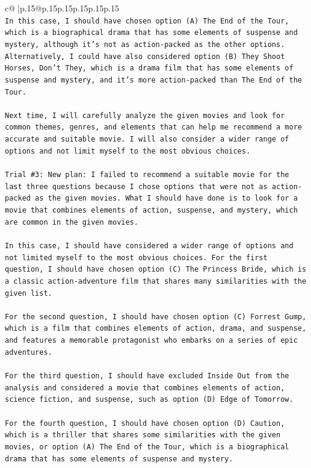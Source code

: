\documentclass{article}
\begin{document}
{\begin{supertabular}{c@{$\;$}|p{.15\linewidth}@{}p{.15\linewidth}p{.15\linewidth}p{.15\linewidth}p{.15\linewidth}p{.15\linewidth}}
{{{\\ 
\texttt{In this case, I should have chosen option (A) The End of the Tour, which is a biographical drama that has some elements of suspense and mystery, although it's not as action{-}packed as the other options. Alternatively, I could have also considered option (B) They Shoot Horses, Don't They, which is a drama film that has some elements of suspense and mystery, and it's more action{-}packed than The End of the Tour. } \\
\\ 
\texttt{Next time, I will carefully analyze the given movies and look for common themes, genres, and elements that can help me recommend a more accurate and suitable movie. I will also consider a wider range of options and not limit myself to the most obvious choices.} \\
\\ 
\texttt{Trial \#3: New plan: I failed to recommend a suitable movie for the last three questions because I chose options that were not as action{-}packed as the given movies. What I should have done is to look for a movie that combines elements of action, suspense, and mystery, which are common in the given movies. } \\
\\ 
\texttt{In this case, I should have considered a wider range of options and not limited myself to the most obvious choices. For the first question, I should have chosen option (C) The Princess Bride, which is a classic action{-}adventure film that shares many similarities with the given list.} \\
\\ 
\texttt{For the second question, I should have chosen option (C) Forrest Gump, which is a film that combines elements of action, drama, and suspense, and features a memorable protagonist who embarks on a series of epic adventures.} \\
\\ 
\texttt{For the third question, I should have excluded Inside Out from the analysis and considered a movie that combines elements of action, science fiction, and suspense, such as option (D) Edge of Tomorrow.} \\
\\ 
\texttt{For the fourth question, I should have chosen option (D) Caution, which is a thriller that shares some similarities with the given movies, or option (A) The End of the Tour, which is a biographical drama that has some elements of suspense and mystery.} \\
}}}
\end{supertabular}}
\end{document}
